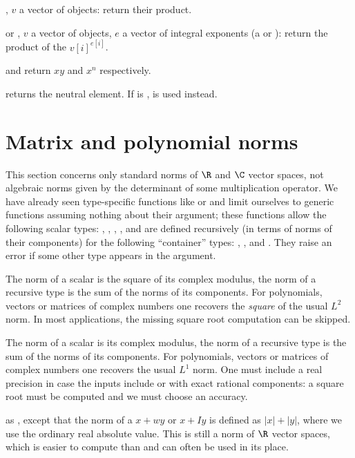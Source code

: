 \item  \kbd{[v, NULL]}, $v$ a vector of objects: return their product.

\item or \kbd{[v, e]},  $v$ a vector of objects, $e$ a vector of integral
exponents (a  or ): return the product of the $v[i]^{e[i]}$.

\noindent {} and 
return $xy$ and $x^n$ respectively.

\noindent {} returns the neutral element. If  is ,
 is used instead.

\section{Matrix and polynomial norms} This section concerns only standard norms
of $\R$ and $\C$ vector spaces, not algebraic norms given by the determinant of
some multiplication operator. We have already seen type-specific functions like
 or  and limit ourselves to generic functions
assuming nothing about their  argument; these functions allow
the following scalar types: , , , ,
 and are defined recursively (in terms of norms of their components)
for the following ``container'' types: , ,  and
. They raise an error if some other type appears in the argument.

 The norm of a scalar is the square of its complex
modulus, the norm of a recursive type is the sum of the norms of its components.
For polynomials, vectors or matrices of complex numbers one recovers the
\emph{square} of the usual $L^2$ norm. In most applications, the missing square
root computation can be skipped.

 The norm of a scalar is its complex
modulus, the norm of a recursive type is the sum of the norms of its components.
For polynomials, vectors or matrices of complex numbers one recovers
the usual $L^1$ norm. One must include a real precision  in case
the inputs include  or  with exact rational components:
a square root must be computed and we must choose an accuracy.

 as , except that the norm
of a  $x + wy$ or  $x + Iy$ is defined as
$|x| + |y|$, where we use the ordinary real absolute value. This is still a norm
of $\R$ vector spaces, which is easier to compute than
 and can often be used in its place.

